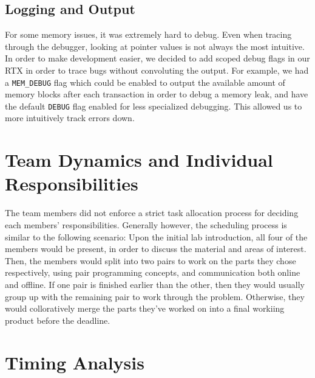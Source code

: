 \documentclass[12pt]{report}
\begin{document}
\section{Logging and Output}
For some memory issues, it was extremely hard to debug. Even when tracing through the debugger, looking at pointer values is not always the most intuitive. In order to make development easier, we decided to add scoped debug flags in our RTX in order to trace bugs without convoluting the output. For example, we had a \texttt{MEM_DEBUG} flag which could be enabled to output the available amount of memory blocks after each transaction in order to debug a memory leak, and have the default \texttt{DEBUG} flag enabled for less specialized debugging. This allowed us to more intuitively track errors down.

\chapter{Team Dynamics and Individual Responsibilities}
The team members did not enforce a strict task allocation process for deciding each members' responsibilities. Generally however, the scheduling process is similar to the following scenario:
Upon the initial lab introduction, all four of the members would be present, in order to discuss the material and areas of interest. Then, the members would split into two pairs to work on the parts they chose respectively, using pair programming concepts, and communication both online and offline. If one pair is finished earlier than the other, then they would usually group up with the remaining pair to work through the problem. Otherwise, they would colloratively merge the parts they've worked on into a final workiing product before the deadline.

\chapter{Timing Analysis}
\end{document}
